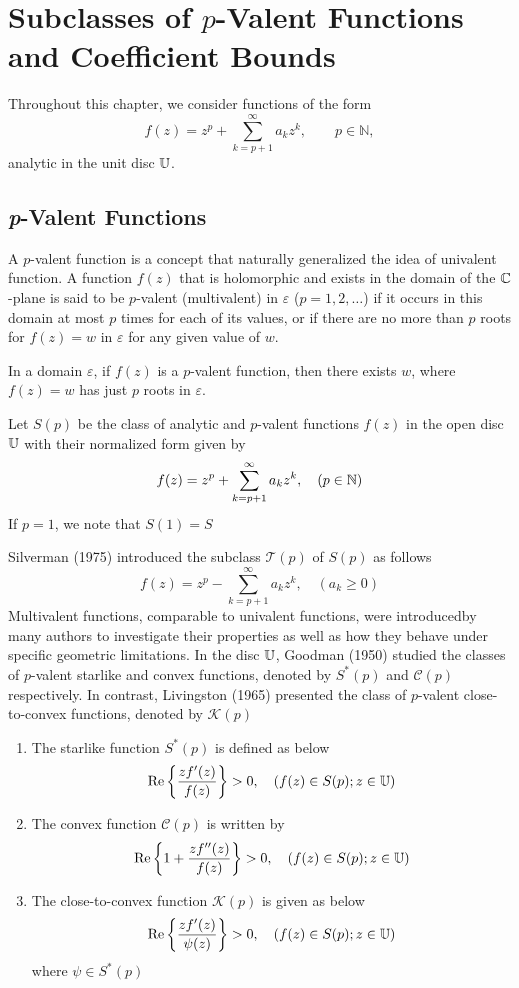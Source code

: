 \chapter{Subclasses of $p$-Valent Functions and Coefficient Bounds}

Throughout this chapter, we consider functions of the form
\[
f(z) = z^p + \sum_{k=p+1}^{\infty} a_k z^k,
\qquad p \in \mathbb{N},
\]
analytic in the unit disc $\mathbb{U}$.

\section{\textit{p}-Valent Functions}
A $p$-valent function is a concept that naturally generalized the idea of univalent function. A function $f(z)$ that is holomorphic and exists in the domain of the $\mathbb{C}$-plane is said to be $p$-valent (multivalent) in $\varepsilon$ ($p = 1, 2, \dots$) if it occurs in this domain at most $p$ times for each of its values, or if there are no more than $p$ roots for $f(z) = w$ in $\varepsilon$ for any given value of $w$.

\begin{theorem}[{[Goodman 1983] [3]}]
	In a domain $\varepsilon$, if $f(z)$ is a $p$-valent function, then there exists $w$, where $f(z) = w$ has just $p$ roots in $\varepsilon$.
\end{theorem}

Let $S(p)$ be the class of analytic and $p$-valent functions $f(z)$ in the open disc $\mathbb{U}$ with their normalized form given by
\[
f(z) = z^p + \sum_{k=p+1}^{\infty} a_k z^k, \quad (p \in \mathbb{N})
\]
If $p=1$, we note that $S(1) = S$

Silverman (1975) introduced the subclass $\mathcal{T}(p)$ of $S(p)$ as follows 
\[
f(z) = z^p - \sum_{k=p+1}^{\infty} a_k z^k, \quad (a_k \ge 0)
\]
Multivalent functions, comparable to univalent functions, were introducedby many authors to investigate their properties as well as how they behave under specific geometric limitations. In the disc $\mathbb{U}$, Goodman (1950) studied the classes of $p$-valent  starlike and convex functions, denoted by $S^*(p)$ and $\mathcal{C}(p)$ respectively. In contrast, Livingston (1965) presented the class of $p$-valent close-to-convex functions, denoted by $\mathcal{K}(p)$

\begin{enumerate}
	\item The starlike function $S^*(p)$ is defined as below
	\[
	\operatorname{Re}\left\{\frac{zf'(z)}{f(z)}\right\} > 0, \quad (f(z) \in S(p); z\in \mathbb{U})
	\]
	
	\item The convex function $\mathcal{C}(p)$ is written by
	\[
	\operatorname{Re}\left\{1 + \frac{zf''(z)}{f(z)}\right\} > 0, \quad (f(z) \in S(p); z\in \mathbb{U})
	\]
	
	\item The close-to-convex function $\mathcal{K}(p)$ is given as below
	\[
	\operatorname{Re}\left\{\frac{zf'(z)}{\psi(z)}\right\} > 0, \quad (f(z) \in S(p); z\in \mathbb{U})
	\]
	where $\psi \in S^*(p)$
\end{enumerate} 

